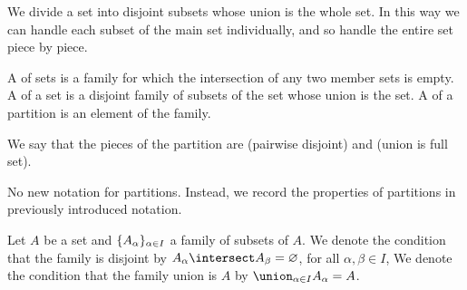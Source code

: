 
\sbasic













\sstart
{}


We divide a set into
disjoint subsets whose
union is the whole set.
In this way we can handle
each subset of the main set
individually, and so handle
the entire set piece by piece.


A 
of sets is a family for which
the intersection of any two
member sets is empty.
A  of
a set is a disjoint family of
subsets of the set
whose union is the set.
A
of a partition is an
element of the family.

We say that the pieces
of the partition
are
 (pairwise disjoint)
and
 (union is full set).


No new notation for partitions.
Instead,
we record the properties
of partitions in previously
introduced notation.

Let $A$ be a set and
$\{A_{\alpha}\}_{\alpha \in I}$
a family of subsets of $A$.
We denote the condition that
the family is disjoint by
$A_{\alpha} \intersect A_{\beta} = \emptyset$,
for all $\alpha,\beta \in I$,
We denote the condition that the family
union is $A$ by
$\union_{\alpha \in I} A_{\alpha} = A$.

\strats
\strats
